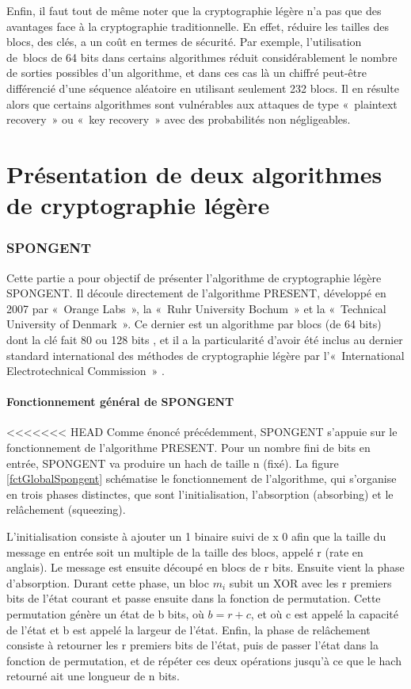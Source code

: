 			Enfin, il faut tout de même noter que la cryptographie légère n'a pas que des
		avantages face à la cryptographie traditionnelle. En effet, réduire les
		tailles des blocs, des clés, a un coût en termes de sécurité. Par exemple,
		l'utilisation de blocs de 64 bits dans certains algorithmes réduit
		considérablement le nombre de sorties possibles d'un algorithme, et dans ces
		cas là un chiffré peut-être différencié d'une séquence aléatoire en utilisant
		seulement 232 blocs. Il en résulte alors que certains algorithmes sont
		vulnérables aux attaques de type « plaintext recovery » ou « key recovery »
		avec des probabilités non négligeables.

\part{Présentation de deux algorithmes de cryptographie légère}

	\section{SPONGENT}

			Cette partie a pour objectif de présenter l'algorithme de cryptographie légère
		SPONGENT. Il découle directement de l'algorithme PRESENT, développé en 2007
		par « Orange Labs », la « Ruhr University Bochum » et la « Technical
		University of Denmark ». Ce dernier est un algorithme par blocs (de 64 bits)
		dont la clé fait 80 ou 128 bits \cite{PRESENT}, et il a la particularité
		d'avoir été inclus au dernier standard international des méthodes de
		cryptographie légère par l'« International Electrotechnical Commission »
		\cite{ultraLightURL}.

		\subsection{Fonctionnement général de SPONGENT}

<<<<<<< HEAD
		Comme énoncé précédemment, SPONGENT s’appuie sur le fonctionnement de l’algorithme PRESENT.
		Pour un nombre fini de bits en entrée, SPONGENT va produire un hach de taille n (fixé).
		La figure \ref{fctGlobalSpongent} schématise le fonctionnement de l’algorithme, qui s’organise en trois phases distinctes, que sont l’initialisation, l’absorption (absorbing) et le relâchement (squeezing).

		L’initialisation consiste à ajouter un 1 binaire suivi de x 0 afin que la taille du message en entrée soit un multiple de la taille des blocs, appelé r (rate en anglais).
		Le message est ensuite découpé en blocs de r bits.
		Ensuite vient la phase d’absorption.
		Durant cette phase, un bloc $m_{i}$ subit un XOR avec les r premiers bits de l’état courant et passe ensuite dans la fonction de permutation.
		Cette permutation génère un état de b bits, où $b = r + c$, et où c est appelé la capacité de l’état et b est appelé la largeur de l’état.
		Enfin, la phase de relâchement consiste à retourner les r premiers bits de l’état, puis de passer l’état dans la fonction de permutation,
		et de répéter ces deux opérations jusqu’à ce que le hach retourné ait une longueur de n bits.

